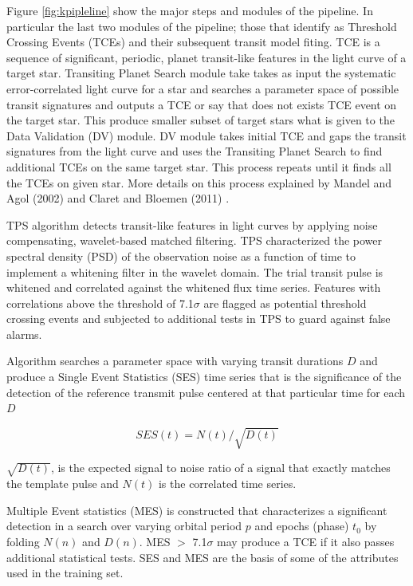 Figure \ref{fig:kpipleline} show the major steps and modules of the pipeline. In particular the last two modules of the pipeline; those that identify as Threshold Crossing Events (TCEs) and their subsequent transit model fiting. TCE is a sequence of significant, periodic, planet transit-like features in the light curve of a target star. Transiting Planet Search module take takes as input the systematic error-correlated light curve for a star and searches a parameter space of possible transit signatures and outputs a TCE or say that does not exists TCE event on the target star. This produce smaller subset of target stars what is given to the Data Validation (DV) module. DV module takes initial TCE and gaps the transit signatures from the light curve and uses the Transiting Planet Search to find additional TCEs on the same target star. This process repeats until it finds all the TCEs on given star. More details on this process explained by Mandel and Agol (2002) \cite{2002ApJ...580L.171M} and Claret and Bloemen (2011) \cite{2011yCat..35290075C}.

TPS algorithm detects transit-like features in light curves by applying noise compensating, wavelet-based matched filtering. TPS characterized the power spectral density (PSD) of the observation noise as a function of time to implement a whitening filter in the wavelet domain. The trial transit pulse is whitened and correlated against the whitened flux time series. Features with correlations above the threshold of 7.1$\sigma$ are flagged as potential threshold crossing events and subjected to additional tests in TPS to guard against false alarms.

Algorithm searches a parameter space with varying transit durations $D$ and produce a Single Event Statistics (SES) time series that is the significance of the detection of the reference transmit pulse centered at that particular time for each $D$

\begin{equation}\label{eq:ses}
	SES(t) = N(t) /\sqrt{D(t)}
\end{equation}

$\sqrt{D(t)}$, is the expected signal to noise ratio of a signal that exactly matches the template pulse and $N(t)$ is the correlated time series.



Multiple Event statistics (MES) is constructed that characterizes a significant detection in a search over varying orbital period $p$ and epochs (phase) $t_0$ by folding $N(n)$ and $D(n)$. MES  $>$ 7.1$\sigma$ may produce a TCE if it also passes additional statistical tests. SES and MES are the basis of some of the attributes used in the training set.


